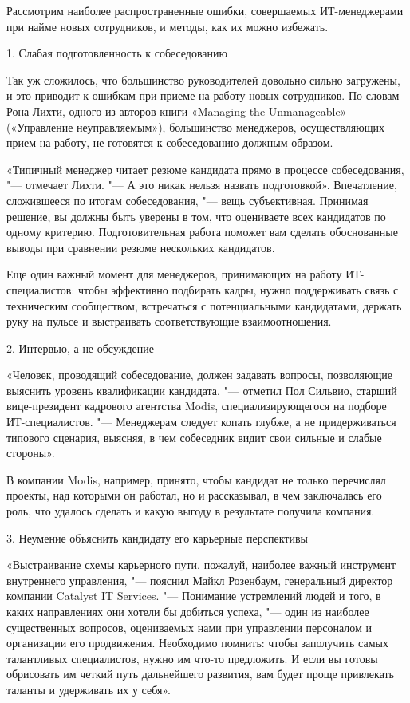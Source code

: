 \documentclass{../industrial-development}
\begin{document}
	\lecturenotes
	
	Рассмотрим наиболее распространенные ошибки, совершаемых ИТ-менеджерами при найме новых сотрудников, и методы, как их можно избежать.
	
	1. \alert{Слабая подготовленность к собеседованию}
	
	Так уж сложилось, что большинство руководителей довольно сильно загружены, и это приводит к ошибкам при приеме на работу новых сотрудников. По словам Рона Лихти, одного из авторов книги «Managing the Unmanageable» («Управление неуправляемым»), большинство менеджеров, осуществляющих прием на работу, не готовятся к собеседованию должным образом.
	
	«Типичный менеджер читает резюме кандидата прямо в процессе собеседования, "--- отмечает Лихти. "--- А это никак нельзя назвать подготовкой». Впечатление, сложившееся по итогам собеседования, "--- вещь субъективная. Принимая решение, вы должны быть уверены в том, что оцениваете всех кандидатов по одному критерию. Подготовительная работа поможет вам сделать обоснованные выводы при сравнении резюме нескольких кандидатов.
	
	Еще один важный момент для менеджеров, принимающих на работу ИТ-специалистов: чтобы эффективно подбирать кадры, нужно поддерживать связь с техническим сообществом, встречаться с потенциальными кандидатами, держать руку на пульсе и выстраивать соответствующие взаимоотношения.
	
	2. \alert{Интервью, а не обсуждение}
	
	«Человек, проводящий собеседование, должен задавать вопросы, позволяющие выяснить уровень квалификации кандидата, "--- отметил Пол Сильвио, старший вице-президент кадрового агентства Modis, специализирующегося на подборе ИТ-специалистов. "--- Менеджерам следует копать глубже, а не придерживаться типового сценария, выясняя, в чем собеседник видит свои сильные и слабые стороны».
	
	В компании Modis, например, принято, чтобы кандидат не только перечислял проекты, над которыми он работал, но и рассказывал, в чем заключалась его роль, что удалось сделать и какую выгоду в результате получила компания.
	
	3. \alert{Неумение объяснить кандидату его карьерные перспективы}
	
	«Выстраивание схемы карьерного пути, пожалуй, наиболее важный инструмент внутреннего управления, "--- пояснил Майкл Розенбаум, генеральный директор компании Catalyst IT Services. "--- Понимание устремлений людей и того, в каких направлениях они хотели бы добиться успеха, "--- один из наиболее существенных вопросов, оцениваемых нами при управлении персоналом и организации его продвижения. Необходимо помнить: чтобы заполучить самых талантливых специалистов, нужно им что-то предложить. И если вы готовы обрисовать им четкий путь дальнейшего развития, вам будет проще привлекать таланты и удерживать их у себя».
	
\end{document}
